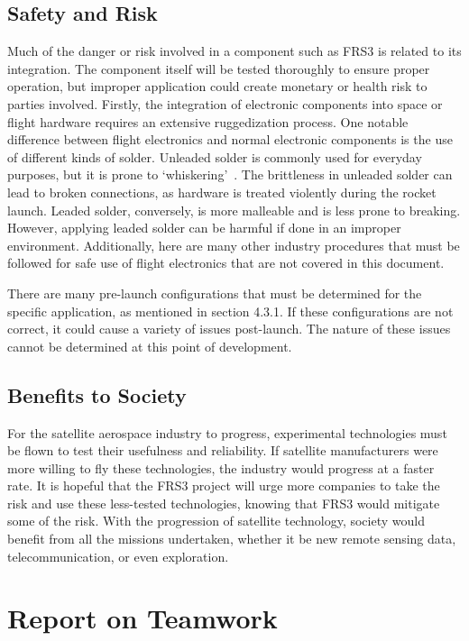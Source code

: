 \documentclass[12pt, twoside]{report}
\begin{document}
\section{Safety and Risk}
\par Much of the danger or risk involved in a component such as FRS3 is related to its integration.
The component itself will be tested thoroughly to ensure proper operation, but improper application could create monetary or health risk to parties involved.
Firstly, the integration of electronic components into space or flight hardware requires an extensive ruggedization process.
One notable difference between flight electronics and normal electronic components is the use of different kinds of solder.
Unleaded solder is commonly used for everyday purposes, but it is prone to `whiskering'~\cite{solderwhisker}.
The brittleness in unleaded solder can lead to broken connections, as hardware is treated violently during the rocket launch.
Leaded solder, conversely, is more malleable and is less prone to breaking.
However, applying leaded solder can be harmful if done in an improper environment.
Additionally, here are many other industry procedures that must be followed for safe use of flight electronics that are not covered in this document.

\par There are many pre-launch configurations that must be determined for the specific application, as mentioned in section 4.3.1. If these configurations are not correct, it could cause a variety of issues post-launch. The nature of these issues cannot be determined at this point of development.

\section{Benefits to Society}
\par For the satellite aerospace industry to progress, experimental technologies must be flown to test their usefulness and reliability. If satellite manufacturers were more willing to fly these technologies, the industry would progress at a faster rate. It is hopeful that the FRS3 project will urge more companies to take the risk and use these less-tested technologies, knowing that FRS3 would mitigate some of the risk. With the progression of satellite technology, society would benefit from all the missions undertaken, whether it be new remote sensing data, telecommunication, or even exploration.

\chapter{Report on Teamwork}
\end{document}
